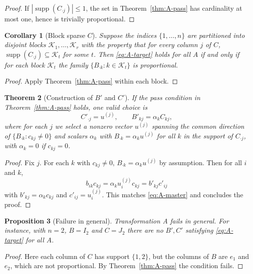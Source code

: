 \documentclass[11pt,a4paper]{article}
\newtheorem{theorem}{Theorem}[section]
\newtheorem{corollary}[theorem]{Corollary}
\newtheorem{proposition}[theorem]{Proposition}
\theoremstyle{definition}
\newcommand{\supp}{\operatorname{supp}}
\begin{document}
\begin{proof}
If $|\supp(C_{\cdot j})|\le 1$, the set in Theorem~\ref{thm:A-pass} has cardinality at most one, hence is trivially proportional.
\end{proof}

\begin{corollary}[Block sparse $C$]\label{cor:A-block}
Suppose the indices $\{1,\dots,n\}$ are partitioned into disjoint blocks $\mathcal{K}_1,\dots,\mathcal{K}_r$ with the property that for every column $j$ of $C$, $\supp(C_{\cdot j})\subseteq \mathcal{K}_t$ for some $t$. Then \eqref{eq:A-target} holds for all $A$ if and only if for each block $\mathcal{K}_t$ the family $\{B_{\cdot k}: k\in\mathcal{K}_t\}$ is proportional.
\end{corollary}

\begin{proof}
Apply Theorem~\ref{thm:A-pass} within each block.
\end{proof}


\begin{theorem}[Construction of $B'$ and $C'$]\label{thm:A-construct}
If the pass condition in Theorem~\ref{thm:A-pass} holds, one valid choice is
\[
C'_{\cdot j}=u^{(j)},\qquad B'_{k j}=\alpha_k C_{k j},
\]
where for each $j$ we select a nonzero vector $u^{(j)}$ spanning the common direction of $\{B_{\cdot k}: c_{k j}\ne 0\}$ and scalars $\alpha_k$ with $B_{\cdot k}=\alpha_k u^{(j)}$ for all $k$ in the support of $C_{\cdot j}$, with $\alpha_k=0$ if $c_{k j}=0$.
\end{theorem}

\begin{proof}
Fix $j$. For each $k$ with $c_{k j}\ne 0$, $B_{\cdot k}=\alpha_k u^{(j)}$ by assumption. Then for all $i$ and $k$,
\[
b_{i k} c_{k j} = \alpha_k u^{(j)}_i c_{k j} = b'_{k j} c'_{i j}
\]
with $b'_{k j}=\alpha_k c_{k j}$ and $c'_{i j}=u^{(j)}_i$. This matches \eqref{eq:A-master} and concludes the proof.
\end{proof}

\begin{proposition}[Failure in general]\label{prop:A-fail}
Transformation A fails in general. For instance, with $n=2$, $B=I_2$ and $C=J_2$ there are no $B',C'$ satisfying \eqref{eq:A-target} for all $A$.
\end{proposition}

\begin{proof}
Here each column of $C$ has support $\{1,2\}$, but the columns of $B$ are $e_1$ and $e_2$, which are not proportional. By Theorem~\ref{thm:A-pass} the condition fails.
\end{proof}
\end{document}
